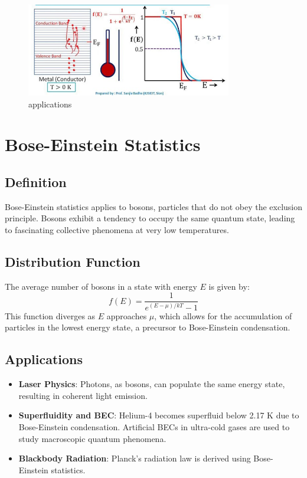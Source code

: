 \documentclass[12pt,a4paper]{article}
\begin{document}
\begin{figure}[H]
    \centering
    \includegraphics[width=0.8\textwidth]{app.png}
    \caption{applications}
\end{figure}

\section{Bose-Einstein Statistics}
\subsection{Definition}
Bose-Einstein statistics applies to bosons, particles that do not obey the exclusion principle. Bosons exhibit a tendency to occupy the same quantum state, leading to fascinating collective phenomena at very low temperatures.

\subsection{Distribution Function}
The average number of bosons in a state with energy $E$ is given by:
\begin{equation}
f(E) = \frac{1}{e^{(E - \mu)/kT} - 1}
\end{equation}
This function diverges as $E$ approaches $\mu$, which allows for the accumulation of particles in the lowest energy state, a precursor to Bose-Einstein condensation.

\subsection{Applications}
\begin{itemize}
    \item \textbf{Laser Physics}: Photons, as bosons, can populate the same energy state, resulting in coherent light emission.
    \item \textbf{Superfluidity and BEC}: Helium-4 becomes superfluid below 2.17 K due to Bose-Einstein condensation. Artificial BECs in ultra-cold gases are used to study macroscopic quantum phenomena.
    \item \textbf{Blackbody Radiation}: Planck's radiation law is derived using Bose-Einstein statistics.
\end{itemize}
\end{document}
